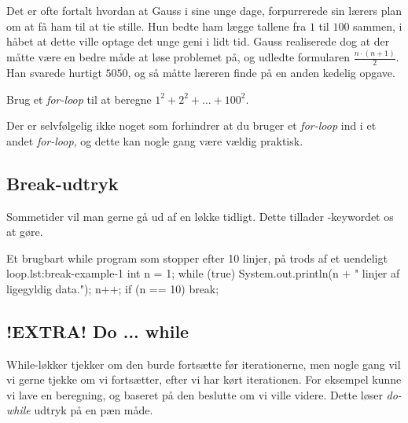 		\begin{exercise}
			Det er ofte fortalt hvordan at Gauss i sine unge dage, forpurrerede sin
			lærers plan om at få ham til at tie stille. Hun bedte ham lægge tallene
			fra \(1\) til \(100\) sammen, i håbet at dette ville optage det unge
			geni i lidt tid. Gauss realiserede dog at der måtte være en bedre måde
			at løse problemet på, og udledte formularen \(\frac{n\cdot(n+1)}{2}\).
			Han svarede hurtigt \(5050\), og så måtte læreren finde på en anden
			kedelig opgave.

			Brug et \emph{for-loop} til at beregne \(1^2+2^2+\dots+100^2\).
		\end{exercise}

		\begin{exercise}
			Der er selvfølgelig ikke noget som forhindrer at du bruger et
			\emph{for-loop} ind i et andet \emph{for-loop}, og dette kan nogle gang
			være vældig praktisk.

		\end{exercise}

	\subsection{Break-udtryk}


		Sommetider vil man gerne gå ud af en løkke tidligt. Dette tillader
		-keywordet os at gøre.

		\begin{JavaCode}{Et brugbart while program som stopper efter 10 linjer{,} på trods af et uendeligt loop.}{lst:break-example-1}
			int n = 1;
			while (true) {
				System.out.println(n + " linjer af ligegyldig data.");
				n++;
				if (n == 10)  break;
			}
		\end{JavaCode}



	\subsection{!EXTRA! Do ... while}


		While-løkker tjekker om den burde fortsætte før iterationerne, men nogle
		gang vil vi gerne tjekke om vi fortsætter, efter vi har kørt
		iterationen. For eksempel kunne vi lave en beregning, og baseret på den
		beslutte om vi ville videre. Dette løser \emph{do-while} udtryk på en
		pæn måde.

